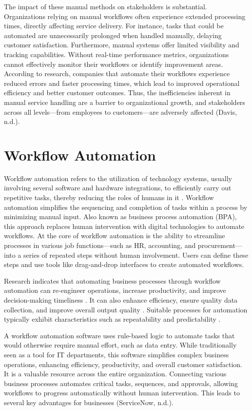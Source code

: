 The impact of these manual methods on stakeholders is substantial. Organizations relying on manual workflows often experience extended processing times, directly affecting service delivery. For instance, tasks that could be automated are unnecessarily prolonged when handled manually, delaying customer satisfaction. Furthermore, manual systems offer limited visibility and tracking capabilities. Without real-time performance metrics, organizations cannot effectively monitor their workflows or identify improvement areas. According to research, companies that automate their workflows experience reduced errors and faster processing times, which lead to improved operational efficiency and better customer outcomes. Thus, the inefficiencies inherent in manual service handling are a barrier to organizational growth, and stakeholders across all levels—from employees to customers—are adversely affected (Davis, n.d.).

\section{Workflow Automation}

Workflow automation refers to the utilization of technology systems, usually involving several software and hardware integrations, to efficiently carry out repetitive tasks, thereby reducing the roles of humans in it \cite{winarko2021}. Workflow automation simplifies the sequencing and completion of tasks within a process by minimizing manual input. Also known as business process automation (BPA), this approach replaces human intervention with digital technologies to automate workflows. At the core of workflow automation is the ability to streamline processes in various job functions—such as HR, accounting, and procurement—into a series of repeated steps without human involvement. Users can define these steps and use tools like drag-and-drop interfaces to create automated workflows. 

Research indicates that automating business processes through workflow automation can re-engineer operations, increase productivity, and improve decision-making timeliness \cite{abecker2000, aversano2002, kumar1999}. It can also enhance efficiency, ensure quality data collection, and improve overall output quality \cite{pakdil2009}. Suitable processes for automation typically exhibit characteristics such as repeatability and predictability \cite{baresi1999, basu2002}. 

A workflow automation software uses rule-based logic to automate tasks that would otherwise require manual effort, such as data entry. While traditionally seen as a tool for IT departments, this software simplifies complex business operations, enhancing efficiency, productivity, and overall customer satisfaction. It is a valuable resource across the entire organization. Connecting various business processes automates critical tasks, sequences, and approvals, allowing workflows to progress automatically without human intervention. This leads to several key advantages for businesses (ServiceNow, n.d.).

